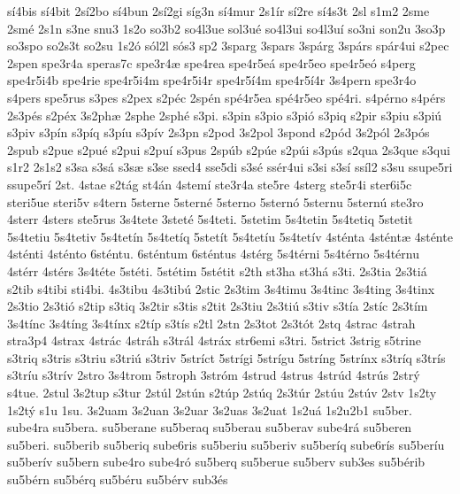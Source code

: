 {s^^ed4bis
s^^ed4bit
2s^^ed2bo
s^^ed4bun
2s^^ed2gi
s^^edg3n
s^^ed4mur
2s1^^edr
s^^ed2re
s^^ed4s3t
2sl
s1m2
2sme
2sm^^e9
2s1n
s3ne
snu3
1s2o
so3b2
so4l3ue
sol3u^^e9
so4l3ui
so4l3u^^ed
so3ni
son2u
3so3p
so3spo
so2s3t
so2su
1s2^^f3
s^^f3l2l
s^^f3s3
sp2
3sparg
3spars
3sp^^e1rg
3sp^^e1rs
sp^^e1r4ui
s2pec
2spen
spe3r4a
speras7c
spe3r4^^e6
spe4rea
spe4r5e^^e1
spe4r5eo
spe4r5e^^f3
s4perg
spe4r5i4b
spe4rie
spe4r5i4m
spe4r5i4r
spe4r5^^ed4m
spe4r5^^ed4r
3s4pern
spe3r4o
s4pers
spe5rus
s3pes
s2pex
s2p^^e9c
2sp^^e9n
sp^^e94r5ea
sp^^e94r5eo
sp^^e94ri.
s4p^^e9rno
s4p^^e9rs
2s3p^^e9s
s2p^^e9x
3s2ph^^e6
2sphe
2sph^^e9
s3pi.
s3pin
s3pio
s3pi^^f3
s3piq
s2pir
s3piu
s3pi^^fa
s3piv
s3p^^edn
s3p^^edq
s3p^^edu
s3p^^edv
2s3pn
s2pod
3s2pol
3spond
s2p^^f3d
3s2p^^f3l
2s3p^^f3s
2spub
s2pue
s2pu^^e9
s2pui
s2pu^^ed
s3pus
2sp^^fab
s2p^^fae
s2p^^fai
s3p^^fas
s2qua
2s3que
s3qui
s1r2
2s1s2
s3sa
s3s^^e1
s3s^^e6
s3se
ssed4
sse5di
s3s^^e9
ss^^e9r4ui
s3si
s3s^^ed
ss^^edl2
s3su
ssupe5ri
ssupe5r^^ed
2st.
4stae
s2t^^e1g
st4^^e1n
4stem^^ed
ste3r4a
ste5re
4sterg
ste5r4i
ster6i5c
steri5ue
steri5v
s4tern
5sterne
5stern^^e9
5sterno
5stern^^f3
5sternu
5stern^^fa
ste3ro
4sterr
4sters
ste5rus
3s4tete
3stet^^e9
5s4teti.
5stetim
5s4tetin
5s4tetiq
5stetit
5s4tetiu
5s4tetiv
5s4tet^^edn
5s4tet^^edq
5stet^^edt
5s4tet^^edu
5s4tet^^edv
4st^^e9nta
4st^^e9nt^^e6
4st^^e9nte
4st^^e9nti
4st^^e9nto
6st^^e9ntu.
6st^^e9ntum
6st^^e9ntus
4st^^e9rg
5s4t^^e9rni
5s4t^^e9rno
5s4t^^e9rnu
4st^^e9rr
4st^^e9rs
3s4t^^e9te
5st^^e9ti.
5st^^e9tim
5st^^e9tit
s2th
st3ha
st3h^^e1
s3ti.
2s3tia
2s3ti^^e1
s2tib
s4tibi
sti4bi.
4s3tibu
4s3tib^^fa
2stic
2s3tim
3s4timu
3s4tinc
3s4ting
3s4tinx
2s3tio
2s3ti^^f3
s2tip
s3tiq
3s2tir
s3tis
s2tit
2s3tiu
2s3ti^^fa
s3tiv
s3t^^eda
2st^^edc
2s3t^^edm
3s4t^^ednc
3s4t^^edng
3s4t^^ednx
s2t^^edp
s3t^^eds
s2tl
2stn
2s3tot
2s3t^^f3t
2stq
4strac
4strah
stra3p4
4strax
4str^^e1c
4str^^e1h
s3tr^^e1l
4str^^e1x
str6emi
s3tri.
5strict
3strig
s5trine
s3triq
s3tris
s3triu
s3tri^^fa
s3triv
5str^^edct
5str^^edgi
5str^^edgu
5str^^edng
5str^^ednx
s3tr^^edq
s3tr^^eds
s3tr^^edu
s3tr^^edv
2stro
3s4trom
5stroph
3str^^f3m
4strud
4strus
4str^^fad
4str^^fas
2str^^fd
s4tue.
2stul
3s2tup
s3tur
2st^^fal
2st^^fan
s2t^^fap
2st^^faq
2s3t^^far
2st^^fau
2st^^fav
2stv
1s2ty
1s2t^^fd
s1u
1su.
3s2uam
3s2uan
3s2uar
3s2uas
3s2uat
1s2u^^e1
1s2u2b1
su5ber.
sube4ra
su5bera.
su5berane
su5beraq
su5berau
su5berav
sube4r^^e1
su5beren
su5beri.
su5berib
su5beriq
sube6ris
su5beriu
su5beriv
su5ber^^edq
sube6r^^eds
su5ber^^edu
su5ber^^edv
su5bern
sube4ro
sube4r^^f3
su5berq
su5berue
su5berv
sub3es
su5b^^e9rib
su5b^^e9rn
su5b^^e9rq
su5b^^e9ru
su5b^^e9rv
sub3^^e9s
}
